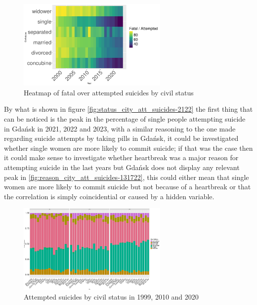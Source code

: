 \documentclass{article}
\begin{document}
\begin{figure}[H]
    \centering
    \includegraphics[width=0.65\textwidth]{imgs/status_foa_heat.pdf}
    \caption{Heatmap of fatal over attempted suicides by civil status }
    \label{fig:status_foa_heat}
\end{figure}
By what is shown in figure \ref{fig:status_city_att_suicides-2122}
the first thing that can be noticed is the peak in the percentage of
single people attempting suicide in Gdańsk in 2021, 2022 and 2023,
with a similar reasoning to the one made regarding suicide attempts
by taking pills in Gdańsk, it could be investigated whether single
women are more likely to commit suicide; if that was the case then 
it could make sense to investigate whether heartbreak was a major reason
for attempting suicide in the last years but Gdańsk does not display any relevant
peak in \ref{fig:reason_city_att_suicides-131722}, this could either mean that 
single women are more likely to commit suicide but not because of 
a heartbreak or that the correlation is simply coincidential or caused
by a hidden variable.
\begin{figure}[H]
    \centering
    \includegraphics[width=0.65\textwidth]{imgs/status_city_att_suicides-991020.pdf}
    \caption{Attempted suicides by civil status  in 1999, 2010 and 2020}
    \label{fig:status_city_att_suicides-991020}
\end{figure}
\end{document}
